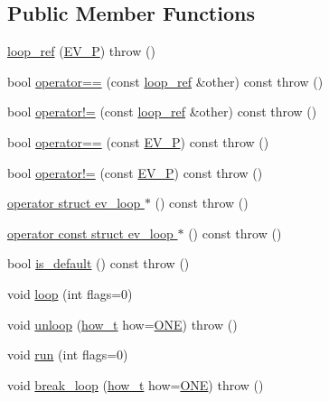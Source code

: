 \subsection*{\-Public \-Member \-Functions}
\begin{DoxyCompactItemize}
\item 
\hyperlink{structev_1_1loop__ref_a6dee3b5f76ff45ed7bc33d1cbab089d4}{loop\-\_\-ref} (\hyperlink{ev_8h_a6e6c6b499d18513c01cf4bde00121617}{\-E\-V\-\_\-\-P})  throw ()
\item 
bool \hyperlink{structev_1_1loop__ref_a1f090cb316333b2c1648df9e160e2ad6}{operator==} (const \hyperlink{structev_1_1loop__ref}{loop\-\_\-ref} \&other) const   throw ()
\item 
bool \hyperlink{structev_1_1loop__ref_aebe64584aeb2fb24a3a3a9bcfa13eebf}{operator!=} (const \hyperlink{structev_1_1loop__ref}{loop\-\_\-ref} \&other) const   throw ()
\item 
bool \hyperlink{structev_1_1loop__ref_a8d7e20431148d5493bc9c2315840bebb}{operator==} (const \hyperlink{ev_8h_a6e6c6b499d18513c01cf4bde00121617}{\-E\-V\-\_\-\-P}) const   throw ()
\item 
bool \hyperlink{structev_1_1loop__ref_aca6d051b2096bc358dfb6625d1b9aebb}{operator!=} (const \hyperlink{ev_8h_a6e6c6b499d18513c01cf4bde00121617}{\-E\-V\-\_\-\-P}) const   throw ()
\item 
\hyperlink{structev_1_1loop__ref_af995b1dfab9287f0f3a98d8134cfd974}{operator struct ev\-\_\-loop $\ast$} () const   throw ()
\item 
\hyperlink{structev_1_1loop__ref_a13b88541123e99d2782cd6c81101417d}{operator const struct ev\-\_\-loop $\ast$} () const   throw ()
\item 
bool \hyperlink{structev_1_1loop__ref_aa9b92fe88733a9bd5be8b42301459b13}{is\-\_\-default} () const   throw ()
\item 
void \hyperlink{structev_1_1loop__ref_a52fa73aeb9b8f6319d2041baf5a8bd58}{loop} (int flags=0)
\item 
void \hyperlink{structev_1_1loop__ref_af629d4578522c4f65e29b0b57249889e}{unloop} (\hyperlink{namespaceev_aca7e42bfd95674ad51c82b41e0c3329e}{how\-\_\-t} how=\hyperlink{namespaceev_aca7e42bfd95674ad51c82b41e0c3329ea7a725f13af144bdef532d0389ba75e0d}{\-O\-N\-E})  throw ()
\item 
void \hyperlink{structev_1_1loop__ref_a64fe8b8a12ce7308a7f5fb9399d36757}{run} (int flags=0)
\item 
void \hyperlink{structev_1_1loop__ref_a1f85df7d48620ed7aefb863acb7167ad}{break\-\_\-loop} (\hyperlink{namespaceev_aca7e42bfd95674ad51c82b41e0c3329e}{how\-\_\-t} how=\hyperlink{namespaceev_aca7e42bfd95674ad51c82b41e0c3329ea7a725f13af144bdef532d0389ba75e0d}{\-O\-N\-E})  throw ()

\end{DoxyCompactItemize}

